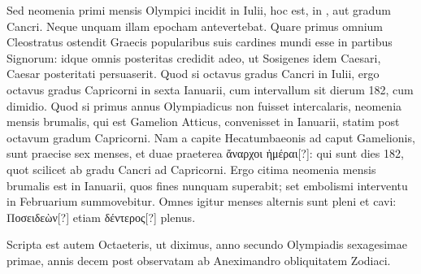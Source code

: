 Sed neomenia
primi mensis Olympici incidit in  Iulii, hoc est,
 in , aut
 gradum Cancri.
Neque unquam illam epocham antevertebat.
Quare primus omnium Cleostratus ostendit Graecis popularibus suis
cardines mundi esse in  partibus Signorum: idque omnis posteritas
credidit adeo, ut Sosigenes idem Caesari, Caesar posteritati persuaserit.
Quod si octavus gradus Cancri in  Iulii, ergo octavus gradus
Capricorni in sexta Ianuarii, cum intervallum sit dierum 182, cum
dimidio.
Quod si primus annus Olympiadicus non fuisset intercalaris,
neomenia mensis brumalis, qui est Gamelion Atticus, convenisset
in  Ianuarii, statim post octavum gradum Capricorni.
Nam a capite
Hecatumbaeonis ad caput Gamelionis, sunt praecise sex menses, et
duae praeterea \textgreek{ἄναρχοι ἡμέραι[?]}:
 qui sunt dies 182, quot scilicet ab  gradu
Cancri ad  Capricorni.
Ergo citima neomenia mensis brumalis
est in  Ianuarii, quos fines nunquam superabit; set embolismi
interventu in Februarium summovebitur.
Omnes igitur menses
alternis sunt pleni et cavi: \textgreek{Ποσειδεὼν[?]}
 etiam \textgreek{δέντερος[?]} plenus.
%
\begin{table}[htbp]
 
\end{table}
%
Scripta est
autem Octaeteris, ut diximus, anno secundo Olympiadis sexagesimae
primae, annis decem post observatam ab Aneximandro obliquitatem
Zodiaci.

